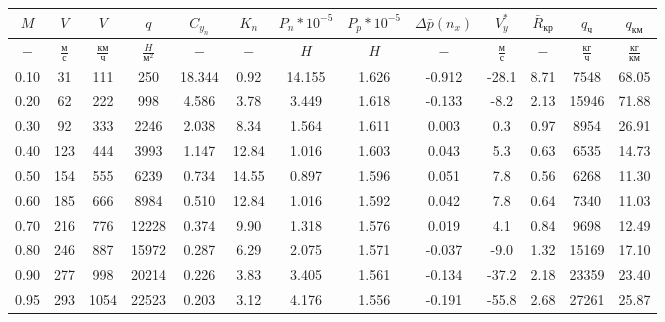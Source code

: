 \begin{tabular}{|c|c|c|c|c|c|c|c|c|c|c|c|c|}
\hline
$M$ & $V$ & $V$ & $q$ & $C_{y_n}$ & $K_n$ & $P_n*10^{-5}$ & $P_p*10^{-5}$ & $\Delta \bar{p}(n_x)$ & $V_y^*$ & $\bar{R}_{кр}$ & $q_{ч}$ & $q_{км}$ \\ 
\hline
$-$ & $\frac{м}{с}$ & $\frac{км}{ч}$ & $\frac{H}{м^2}$ & $-$ & $-$ & $H$ & $H$ & $-$ & $\frac{м}{с}$ & $-$ & $\frac{кг}{ч}$ & $\frac{кг}{км}$ \\ 
\hline
0.10 & 31 & 111 & 250 & 18.344 & 0.92 & 14.155 & 1.626 & -0.912 & -28.1 & 8.71 & 7548 & 68.05 \\ 
\hline
0.20 & 62 & 222 & 998 & 4.586 & 3.78 & 3.449 & 1.618 & -0.133 & -8.2 & 2.13 & 15946 & 71.88 \\ 
\hline
0.30 & 92 & 333 & 2246 & 2.038 & 8.34 & 1.564 & 1.611 & 0.003 & 0.3 & 0.97 & 8954 & 26.91 \\ 
\hline
0.40 & 123 & 444 & 3993 & 1.147 & 12.84 & 1.016 & 1.603 & 0.043 & 5.3 & 0.63 & 6535 & 14.73 \\ 
\hline
0.50 & 154 & 555 & 6239 & 0.734 & 14.55 & 0.897 & 1.596 & 0.051 & 7.8 & 0.56 & 6268 & 11.30 \\ 
\hline
0.60 & 185 & 666 & 8984 & 0.510 & 12.84 & 1.016 & 1.592 & 0.042 & 7.8 & 0.64 & 7340 & 11.03 \\ 
\hline
0.70 & 216 & 776 & 12228 & 0.374 & 9.90 & 1.318 & 1.576 & 0.019 & 4.1 & 0.84 & 9698 & 12.49 \\ 
\hline
0.80 & 246 & 887 & 15972 & 0.287 & 6.29 & 2.075 & 1.571 & -0.037 & -9.0 & 1.32 & 15169 & 17.10 \\ 
\hline
0.90 & 277 & 998 & 20214 & 0.226 & 3.83 & 3.405 & 1.561 & -0.134 & -37.2 & 2.18 & 23359 & 23.40 \\ 
\hline
0.95 & 293 & 1054 & 22523 & 0.203 & 3.12 & 4.176 & 1.556 & -0.191 & -55.8 & 2.68 & 27261 & 25.87 \\ 
\hline
\end{tabular}